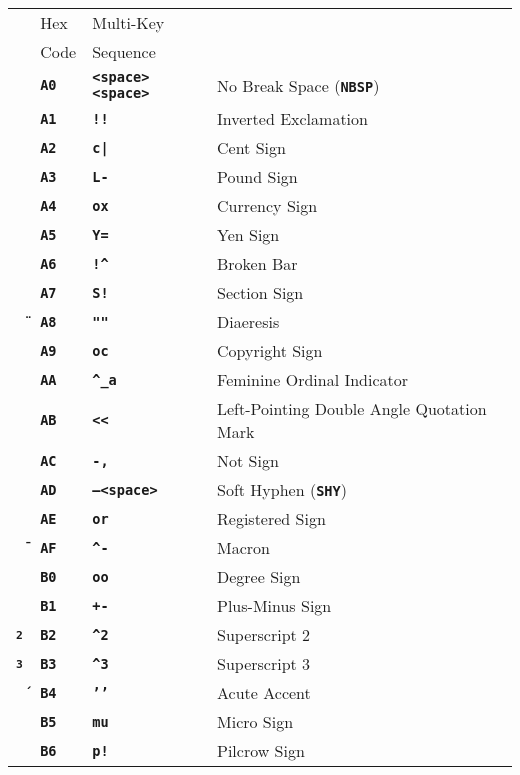 \documentclass[12pt]{article}
\makeatletter
\newcommand{\TT}[1]{{\tt \bfseries #1}}
\newcommand{\ttkey}[1]{\TT{#1}\index{#1@{\tt #1}}}
\newlength{\figurewidth}
\newenvironment{boxedfigure}[1][!btp]%
	{\begin{figure*}[#1]
	 \begin{lrbox}{\figurebox}
	 \begin{minipage}{\figurewidth}

	 \vspace*{1ex}}%
	{
	 \vspace*{1ex}

	 \end{minipage}
	 \end{lrbox}

	 \vspace*{-15ex}
	 \centering
	 \fbox{\hspace*{0.1in}\usebox{\figurebox}\hspace*{0.1in}}
	 \end{figure*}}
\makeatother
\begin{document}
\begin{boxedfigure}[p]
\begin{tabular}{llll}
& Hex & Multi-Key \\
& Code & Sequence
\\[1ex]
\TT{~}
  & \TT{A0} & \TT{<space><space>} & No Break Space (\ttkey{NBSP}) \\
\TT{\textexclamdown}
  & \TT{A1} & \TT{!!} & Inverted Exclamation \\
\TT{\textcent}
  & \TT{A2} & \TT{c|} & Cent Sign \\
\TT{\textsterling}
  & \TT{A3} & \TT{L-} & Pound Sign \\
\TT{\textcurrency}
  & \TT{A4} & \TT{ox} & Currency Sign \\
\TT{\textyen}
  & \TT{A5} & \TT{Y=} & Yen Sign \\
\TT{\textbrokenbar}
  & \TT{A6} & \TT{!\textasciicircum} & Broken Bar \\
\TT{\textsection}
  & \TT{A7} & \TT{S!} & Section Sign \\
\TT{\"{~}}
  & \TT{A8} & \TT{""} & Diaeresis \\
\TT{\textcopyright}
  & \TT{A9} & \TT{oc} & Copyright Sign \\
\TT{\textordfeminine}
  & \TT{AA} & \TT{\textasciicircum\_a} & Feminine Ordinal Indicator \\
\TT{\guillemotleft}
  & \TT{AB} & \TT{<{}<} & Left-Pointing Double Angle Quotation Mark \\
\TT{\textlnot}
  & \TT{AC} & \TT{-,} & Not Sign \\
\TT{~}
  & \TT{AD} & \TT{--<space>} & Soft Hyphen (\TT{SHY}) \\
\TT{\textregistered}
  & \TT{AE} & \TT{or} & Registered Sign \\
\TT{\={~}}
  & \TT{AF} & \TT{\textasciicircum-} & Macron \\
\TT{\textdegree}
  & \TT{B0} & \TT{oo} & Degree Sign \\
\TT{\textpm}
  & \TT{B1} & \TT{+-} & Plus-Minus Sign \\
\TT{\textsuperscript{2}}
  & \TT{B2} & \TT{\textasciicircum2} & Superscript 2 \\
\TT{\textsuperscript{3}}
  & \TT{B3} & \TT{\textasciicircum3} & Superscript 3 \\
\TT{\'{~}}
  & \TT{B4} & \TT{'{}'} & Acute Accent \\
\TT{\textmu}
  & \TT{B5} & \TT{mu} & Micro Sign \\
\TT{\textpilcrow}
  & \TT{B6} & \TT{p!} & Pilcrow Sign \\

\end{tabular}
\end{boxedfigure}
\end{document}
